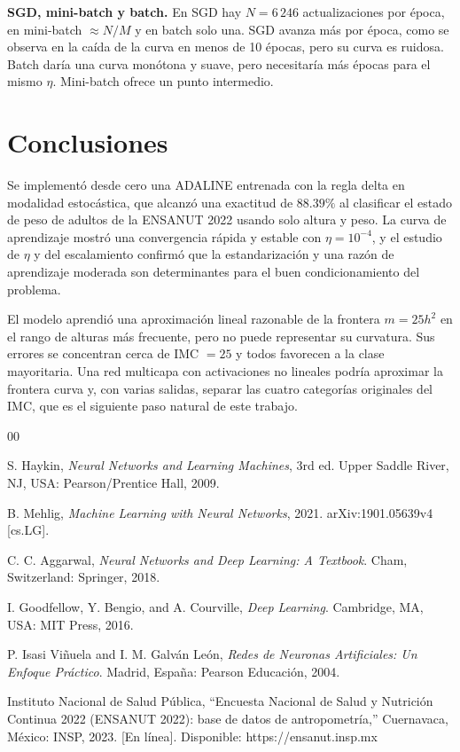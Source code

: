 \documentclass[conference]{IEEEtran}
\begin{document}
\textbf{SGD, mini-batch y batch.} En SGD hay $N=6\,246$ actualizaciones por
época, en mini-batch $\approx N/M$ y en batch solo una. SGD avanza más por
época, como se observa en la caída de la curva en menos de 10 épocas, pero su
curva es ruidosa. Batch daría una curva monótona y suave, pero necesitaría más
épocas para el mismo $\eta$. Mini-batch ofrece un punto intermedio.

\section{Conclusiones}
Se implementó desde cero una ADALINE entrenada con la regla delta en modalidad
estocástica, que alcanzó una exactitud de $88.39\%$ al clasificar el estado de
peso de adultos de la ENSANUT 2022 usando solo altura y peso. La curva de
aprendizaje mostró una convergencia rápida y estable con $\eta=10^{-4}$, y el
estudio de $\eta$ y del escalamiento confirmó que la estandarización y una
razón de aprendizaje moderada son determinantes para el buen
condicionamiento del problema.

El modelo aprendió una aproximación lineal razonable de la frontera $m=25h^2$
en el rango de alturas más frecuente, pero no puede representar su curvatura.
Sus errores se concentran cerca de IMC $=25$ y todos favorecen a la clase
mayoritaria. Una red multicapa con activaciones no lineales podría
aproximar la frontera curva y, con varias salidas, separar las cuatro
categorías originales del IMC, que es el siguiente paso natural de este
trabajo.

\begin{thebibliography}{00}

 S. Haykin, \textit{Neural Networks and Learning Machines}, 3rd ed. Upper Saddle River, NJ, USA: Pearson/Prentice Hall, 2009.

 B. Mehlig, \textit{Machine Learning with Neural Networks}, 2021. arXiv:1901.05639v4 [cs.LG].

 C. C. Aggarwal, \textit{Neural Networks and Deep Learning: A Textbook}. Cham, Switzerland: Springer, 2018.

 I. Goodfellow, Y. Bengio, and A. Courville, \textit{Deep Learning}. Cambridge, MA, USA: MIT Press, 2016.

 P. Isasi Viñuela and I. M. Galván León, \textit{Redes de Neuronas Artificiales: Un Enfoque Práctico}. Madrid, España: Pearson Educación, 2004.

 Instituto Nacional de Salud Pública, ``Encuesta Nacional de Salud y Nutrición Continua 2022 (ENSANUT 2022): base de datos de antropometría,'' Cuernavaca, México: INSP, 2023. [En línea]. Disponible: https://ensanut.insp.mx

\end{thebibliography}
\end{document}
